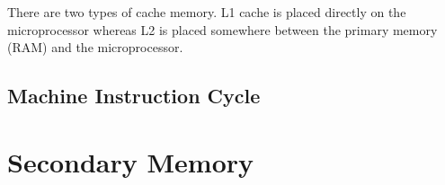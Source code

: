 There are two types of cache memory. L1 cache is placed directly on the microprocessor whereas L2 is placed somewhere between the primary memory (RAM) and the microprocessor. 

\subsection*{Machine Instruction Cycle}
\section{Secondary Memory}
